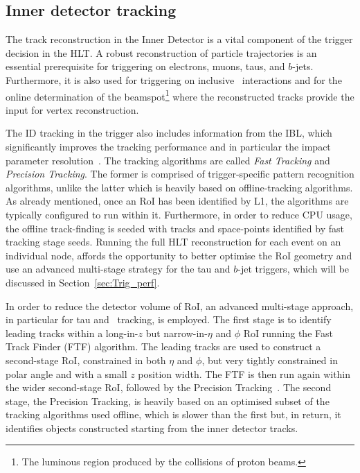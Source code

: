 		
		\subsection{Inner detector tracking}
		\label{sec:tracking}

			The track reconstruction in the Inner Detector is a vital component of the trigger decision in the \ac{HLT}. A robust reconstruction of particle trajectories is an essential prerequisite for triggering on electrons, muons, taus, and $b$-jets. Furthermore, it is also used for triggering on inclusive \pp\ interactions and for the online determination of the beamspot\footnote{The luminous region produced by the collisions of proton beams.} where the reconstructed tracks provide the input for vertex reconstruction.

			The ID tracking in the trigger also includes information from the IBL, which significantly improves the tracking performance and in particular the impact parameter resolution~\cite{IBLTDR}. The tracking algorithms are called \emph{Fast Tracking} and \emph{Precision Tracking}. The former is comprised of trigger-specific pattern recognition algorithms, unlike the latter which is heavily based on offline-tracking algorithms.
			As already mentioned, once an \ac{RoI} has been identified by \ac{L1}, the algorithms are typically configured to run within it. Furthermore, in order to reduce CPU usage, the offline track-finding is seeded with tracks and space-points identified by fast tracking stage seeds. Running the full \ac{HLT} reconstruction for each event on an individual node, affords the opportunity to better optimise the \ac{RoI} geometry and use an advanced multi-stage strategy for the tau and $b$-jet triggers, which will be discussed in Section~\ref{sec:Trig_perf}. 

			In order to reduce the detector volume of \ac{RoI}, an advanced multi-stage approach, in particular for tau and \bj\ tracking, is employed. The first stage is to identify leading tracks within a long-in-$z$ but narrow-in-$\eta$ and $\phi$ \ac{RoI} running the Fast Track Finder (FTF) algorithm. The leading tracks are used to construct a second-stage \ac{RoI}, constrained in both $\eta$ and $\phi$, but very tightly constrained in polar angle and with a small $z$ position width. The FTF is then run again within the wider second-stage \ac{RoI}, followed by the Precision Tracking~\cite{Miano:2016oty}. The second stage, the Precision Tracking, is heavily based on an optimised subset of the tracking algorithms used offline, which is slower than the first but, in return, it identifies objects constructed starting from the inner detector tracks.

